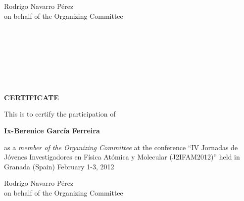 \documentclass [13pt,a4paper] {letter}
\begin{document}
\vspace {4cm}
\begin{raggedleft}
Rodrigo Navarro Pérez\\
on behalf of the Organizing Committee
\newpage
\end{raggedleft}
\begin{verbatim}







\end{verbatim}
\pagestyle{empty}
\begin{center}
{\bf {\Huge CERTIFICATE}}

\vspace {1.5cm}
This is to certify the participation of
\vspace {1cm}

{\bf \Large  Ix-Berenice    García Ferreira }
\vspace {1cm}

as a \emph{member of the Organizing Committee} at the conference { \textquotedblleft IV Jornadas de Jóvenes Investigadores en Física Atómica y Molecular (J2IFAM2012)\textquotedblright} 
held in Granada (Spain) February 1-3, 2012
\end{center}
\vspace {4cm}
\begin{raggedleft}
Rodrigo Navarro Pérez\\
on behalf of the Organizing Committee
\newpage
\end{raggedleft}
\end{document}
